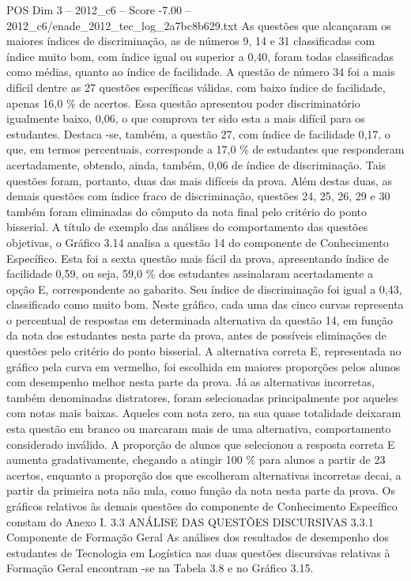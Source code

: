 \begin{textsample}{POS Dim 3 – 2012\_c6 – Score -7.00 – 2012\_c6/enade\_2012\_tec\_log\_2a7bc8b629.txt}
As questões que alcançaram os maiores índices de discriminação, as de números 9, 14 e 31 classificadas com índice muito bom, com índice igual ou superior a 0,40, foram todas classificadas como médias, quanto ao índice de facilidade.
A questão de número 34 foi a mais difícil dentre as 27 questões específicas válidas, com baixo índice de facilidade, apenas 16,0 \% de acertos.
Essa questão apresentou poder discriminatório igualmente baixo, 0,06, o que comprova ter sido esta a mais difícil para os estudantes.
Destaca -se, também, a questão 27, com índice de facilidade 0,17, o que, em termos percentuais, corresponde a 17,0 \% de estudantes que responderam acertadamente, obtendo, ainda, também, 0,06 de índice de discriminação.
Tais questões foram, portanto, duas das mais difíceis da prova.
Além destas duas, as demais questões com índice fraco de discriminação, questões 24, 25, 26, 29 e 30 também foram eliminadas do cômputo da nota final pelo critério do ponto bisserial.
A título de exemplo das análises do comportamento das questões objetivas, o Gráfico 3.14 analisa a questão 14 do componente de Conhecimento Específico.
Esta foi a sexta questão mais fácil da prova, apresentando índice de facilidade 0,59, ou seja, 59,0 \% dos estudantes assinalaram acertadamente a opção E, correspondente ao gabarito.
Seu índice de discriminação foi igual a 0,43, classificado como muito bom.
Neste gráfico, cada uma das cinco curvas representa o percentual de respostas em determinada alternativa da questão 14, em função da nota dos estudantes nesta parte da prova, antes de possíveis eliminações de questões pelo critério do ponto bisserial.
A alternativa correta E, representada no gráfico pela curva em vermelho, foi escolhida em maiores proporções pelos alunos com desempenho melhor nesta parte da prova.
Já as alternativas incorretas, também denominadas distratores, foram selecionadas principalmente por aqueles com notas mais baixas.
Aqueles com nota zero, na sua quase totalidade deixaram esta questão em branco ou marcaram mais de uma alternativa, comportamento considerado inválido.
A proporção de alunos que selecionou a resposta correta E aumenta gradativamente, chegando a atingir 100 \% para alunos a partir de 23 acertos, enquanto a proporção dos que escolheram alternativas incorretas decai, a partir da primeira nota não nula, como função da nota nesta parte da prova.
Os gráficos relativos às demais questões do componente de Conhecimento Específico constam do Anexo I. 3.3 ANÁLISE DAS QUESTÕES DISCURSIVAS 3.3.1 Componente de Formação Geral As análises dos resultados de desempenho dos estudantes de Tecnologia em Logística nas duas questões discursivas relativas à Formação Geral encontram -se na Tabela 3.8 e no Gráfico 3.15.

\end{textsample}
